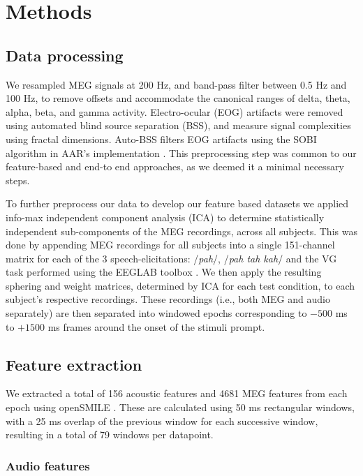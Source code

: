 \documentclass[utf8]{frontiersSCNS} %
\begin{document}
\section{Methods}


\subsection{Data processing}


We resampled MEG signals at 200 Hz, and band-pass filter between 0.5 Hz and 100 Hz, to remove offsets and accommodate the canonical ranges of delta, theta, alpha, beta, and gamma activity. Electro-ocular (EOG) artifacts were removed using automated blind source separation (BSS), and measure signal complexities using fractal dimensions. Auto-BSS filters EOG artifacts using the SOBI algorithm in AAR's implementation \cite{eog}. This preprocessing step was common to our feature-based and end-to end approaches, as we deemed it a minimal necessary steps.

To further preprocess our data to develop our feature based datasets we applied info-max independent component analysis (ICA) \cite{Bell1995} to determine statistically independent sub-components of the MEG recordings, across all subjects. This was done by appending MEG recordings for all subjects into a single 151-channel matrix for each of the 3 speech-elicitations: /{\em pah}/, /{\em pah tah kah}/ and the VG task performed using the EEGLAB toolbox \cite{Delorme04eeglab}. We then apply the resulting sphering and weight matrices, determined by ICA for each test condition, to each subject's respective recordings. These recordings (i.e., both MEG and audio separately) are then separated into windowed epochs corresponding to $-500$ ms to $+1500$ ms frames around the onset of the stimuli prompt.

\subsection{Feature extraction}

We extracted a total of 156 acoustic features and 4681 MEG features from each epoch using openSMILE \cite{Eyben13-RDI}. These are calculated using 50 ms rectangular windows, with a 25 ms overlap of the previous window for each successive window, resulting in a total of 79 windows per datapoint.

\subsubsection{Audio features}
\end{document}
